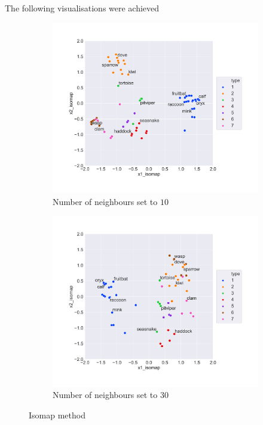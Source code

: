 The following visualisations were achieved
\begin{figure}[H]
   \centering
   \begin{subfigure}[b]{0.6\linewidth}
       \centering
       \includegraphics[width=\textwidth]{../Visualization_Isomap_n_10.png}
       \caption{Number of neighbours set to $10$}
       \label{fig:isomap 10}
   \end{subfigure}
   \hspace{\fill}
   \begin{subfigure}[b]{0.6\linewidth}
       \centering
       \includegraphics[width=\textwidth]{../Visualization_Isomap_n_30.png}
       \caption{Number of neighbours set to $30$}
       \label{fig:isomap 30}
   \end{subfigure}
      \caption{Isomap method}
      \label{fig:isomap}

\end{figure}

